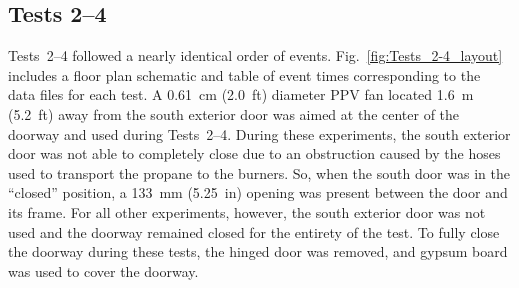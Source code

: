 \documentclass[12pt,oneside]{book}
\begin{document}
\subsection{Tests 2--4}
Tests~2--4 followed a nearly identical order of events. Fig.~\ref{fig:Tests_2-4_layout} includes a floor plan schematic and table of event times corresponding to the data files for each test. A 0.61~cm (2.0~ft) diameter PPV fan located 1.6~m (5.2~ft) away from the south exterior door was aimed at the center of the doorway and used during Tests~2--4. During these experiments, the south exterior door was not able to completely close due to an obstruction caused by the hoses used to transport the propane to the burners. So, when the south door was in the ``closed'' position, a 133~mm (5.25~in) opening was present between the door and its frame. For all other experiments, however, the south exterior door was not used and the doorway remained closed for the entirety of the test. To fully close the doorway during these tests, the hinged door was removed, and gypsum board was used to cover the doorway.

\end{document}
